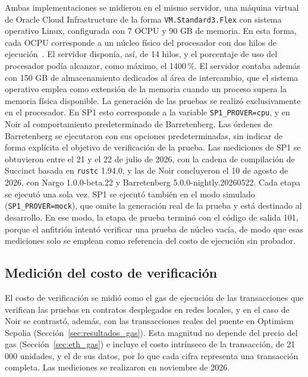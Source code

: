 Ambas implementaciones se midieron en el mismo servidor, una máquina virtual de Oracle Cloud
Infrastructure de la forma \texttt{VM.Standard3.Flex} con sistema operativo Linux, configurada con
7 OCPU y 90 GB de memoria. En esta forma, cada OCPU corresponde a un núcleo físico del procesador
con dos hilos de ejecución~\cite{ocicomputeshapes}. El servidor disponía, así, de 14 hilos, y
el porcentaje de uso del procesador podía alcanzar, como máximo, el 1400\,\%. El servidor contaba
además con 150 GB de almacenamiento dedicados al área de intercambio, que el sistema operativo
emplea como extensión de la memoria cuando un proceso supera la memoria física disponible. La
generación de las pruebas se realizó exclusivamente en el procesador. En SP1 esto corresponde a la
variable \texttt{SP1\_PROVER=cpu}, y en Noir al comportamiento predeterminado de Barretenberg. Las
órdenes de Barretenberg se ejecutaron con sus opciones predeterminadas, sin indicar de forma
explícita el objetivo de verificación de la prueba. Las mediciones de SP1 se obtuvieron
entre el 21 y el 22 de julio de 2026, con la cadena de compilación de Succinct basada en
\texttt{rustc} 1.94.0, y las de Noir concluyeron el 10 de agosto de 2026, con Nargo
1.0.0-beta.22 y Barretenberg 5.0.0-nightly.20260522. Cada etapa se ejecutó una sola vez. SP1 se ejecutó también en el modo
simulado (\texttt{SP1\_PROVER=mock}), que omite la generación real de la prueba y está destinado al
desarrollo. En ese modo, la etapa de prueba terminó con el código de salida 101, porque el
anfitrión intentó verificar una prueba de núcleo vacía, de modo que esas mediciones solo se emplean
como referencia del costo de ejecución sin probador.
\subsection{Medición del costo de verificación}
\label{sec:metodologia_gas}

El costo de verificación se midió como el gas de ejecución de las transacciones que verifican las
pruebas en contratos desplegados en redes locales, y en el caso de Noir se contrastó, además, con
las transacciones reales del puente en Optimism Sepolia (Sección~\ref{sec:resultados_gas}). Esta magnitud no depende del precio del gas
(Sección~\ref{sec:eth_gas}) e incluye el costo intrínseco de la transacción, de 21\,000 unidades,
y el de sus datos, por lo que cada cifra representa una transacción completa. Las mediciones se
realizaron en noviembre de 2026.

